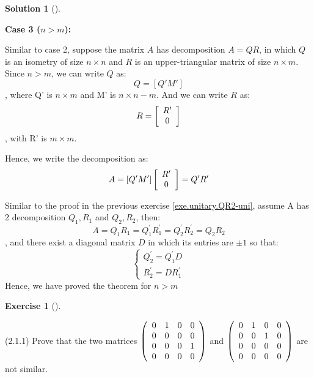 \documentclass[numbers=enddot,12pt,final,onecolumn,notitlepage]{scrartcl}
\newcounter{exer}
\newcounter{sol}
\theoremstyle{definition}
\newtheorem{exmp}[exer]{Exercise}
\newenvironment{exercise}[1][]
{\begin{exmp}[#1]\begin{leftbar}}
        {\end{leftbar}\end{exmp}}
\newtheorem{solu}[sol]{Solution}
\newenvironment{solution}[1][]
{\begin{solu}[#1]\begin{leftbar}}
        {\end{leftbar}\end{solu}}
\begin{document}
\begin{solution}
	\textbf{Case 3 ($n > m$):}

	Similar to case 2, suppose the matrix $A$ has decomposition $A = QR$, in which $Q$ is an isometry of size $n \times n$ and $R$ is an upper-triangular matrix of size $n \times m$. Since $n > m$, we can write $Q$ as:
	\[
		Q = [Q' M']
	\]
	, where Q' is $n \times m$ and M' is $n \times n-m$. And we can write $R$ as:
	\[
		R = \left[
			\begin{array}
				[c]{c}%
				R' \\
				0
			\end{array}
			\right]
	\]
	, with R' is $m \times m$.

	Hence, we write the decomposition as:
	\[
		A = [Q' M'] \left[
			\begin{array}
				[c]{c}%
				R' \\
				0
			\end{array}\right] = Q'R'
	\]

	Similar to the proof in the previous exercise \ref{exe.unitary.QR2-uni}, assume A has 2 decomposition $Q_1, R_1$ and $Q_2, R_2$, then:
	\[
		A = Q_1 R_1 = Q_1^{'} R_1^{'} = Q_2^{'} R_2^{'} = Q_2 R_2
	\]
	, and there exist a diagonal matrix $D$ in which its entries are $\pm 1$ so that:
	\[
		\begin{cases}
			Q_2^{'} = Q_1^{'} D \\
			R_2^{'} = D R_1^{'}
		\end{cases}
	\]
	Hence, we have proved the theorem for $n > m$

\end{solution}


\begin{exercise}
	\label{exe.schurtri.similar.two-4x4s} (2.1.1) Prove that the two matrices
	$\left(
		\begin{array}
				[c]{cccc}%
				0 & 1 & 0 & 0 \\
				0 & 0 & 0 & 0 \\
				0 & 0 & 0 & 1 \\
				0 & 0 & 0 & 0
			\end{array}
		\right)  $ and $\left(
		\begin{array}
				[c]{cccc}%
				0 & 1 & 0 & 0 \\
				0 & 0 & 1 & 0 \\
				0 & 0 & 0 & 0 \\
				0 & 0 & 0 & 0
			\end{array}
		\right)  $ are not similar.
\end{exercise}
\end{document}
